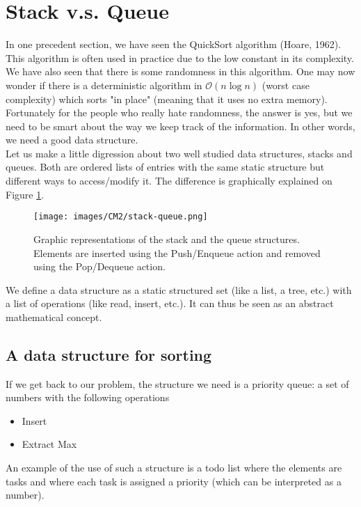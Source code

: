 \section{Stack v.s. Queue}

In one precedent section, we have seen the QuickSort algorithm (Hoare, 1962). This algorithm is often used in practice due to the low constant in its complexity. We have also seen that there is some randomness in this algorithm. One may now wonder if there is a deterministic algorithm in $\mathcal{O}(n\log n)$ (worst case complexity) which sorts "in place" (meaning that it uses no extra memory).\\ 

Fortunately for the people who really hate randomness, the answer is yes, but we need to be smart about the way we keep track of the information. In other words, we need a good data structure.\\

Let us make a little digression about two well studied data structures, stacks and queues. Both are ordered lists of entries with the same static structure but different ways to access/modify it. The difference is graphically explained on Figure \ref{stackandqueue}.

\begin{figure}[!h]
	\centering
 	\texttt{[image: images/CM2/stack-queue.png]}
  	\caption{Graphic representations of the stack and the queue structures. Elements are inserted using the Push/Enqueue action and removed using the Pop/Dequeue action.}
   	\label{stackandqueue}
\end{figure}

We define a data structure as a static structured set (like a list, a tree, etc.) with a list of operations (like read, insert, etc.). It can thus be seen as an abstract mathematical concept. 

\subsection{A data structure for sorting}

If we get back to our problem, the structure we need is a priority queue: a set of numbers with the following operations
\begin{itemize}
\item Insert
\item Extract Max
\end{itemize}

An example of the use of such a structure is a todo list where the elements are tasks and where each task is assigned a priority (which can be interpreted as a number).\\

